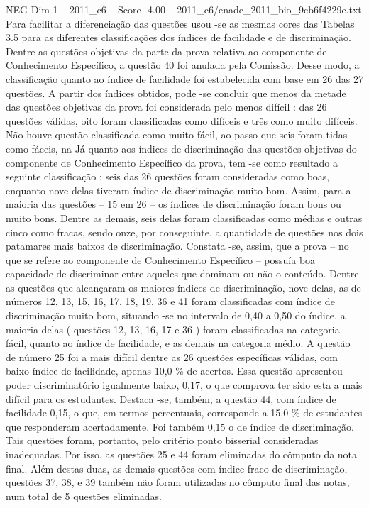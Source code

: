 \begin{textsample}{NEG Dim 1 – 2011\_c6 – Score -4.00 – 2011\_c6/enade\_2011\_bio\_9cb6f4229e.txt}
Para facilitar a diferenciação das questões usou -se as mesmas cores das Tabelas 3.5 para as diferentes classificações dos índices de facilidade e de discriminação.
Dentre as questões objetivas da parte da prova relativa ao componente de Conhecimento Específico, a questão 40 foi anulada pela Comissão.
Desse modo, a classificação quanto ao índice de facilidade foi estabelecida com base em 26 das 27 questões.
A partir dos índices obtidos, pode -se concluir que menos da metade das questões objetivas da prova foi considerada pelo menos difícil : das 26 questões válidas, oito foram classificadas como difíceis e três como muito difíceis.
Não houve questão classificada como muito fácil, ao passo que seis foram tidas como fáceis, na Já quanto aos índices de discriminação das questões objetivas do componente de Conhecimento Específico da prova, tem -se como resultado a seguinte classificação : seis das 26 questões foram consideradas como boas, enquanto nove delas tiveram índice de discriminação muito bom.
Assim, para a maioria das questões – 15 em 26 – os índices de discriminação foram bons ou muito bons.
Dentre as demais, seis delas foram classificadas como médias e outras cinco como fracas, sendo onze, por conseguinte, a quantidade de questões nos dois patamares mais baixos de discriminação.
Constata -se, assim, que a prova – no que se refere ao componente de Conhecimento Específico – possuía boa capacidade de discriminar entre aqueles que dominam ou não o conteúdo.
Dentre as questões que alcançaram os maiores índices de discriminação, nove delas, as de números 12, 13, 15, 16, 17, 18, 19, 36 e 41 foram classificadas com índice de discriminação muito bom, situando -se no intervalo de 0,40 a 0,50 do índice, a maioria delas ( questões 12, 13, 16, 17 e 36 ) foram classificadas na categoria fácil, quanto ao índice de facilidade, e as demais na categoria médio.
A questão de número 25 foi a mais difícil dentre as 26 questões específicas válidas, com baixo índice de facilidade, apenas 10,0 \% de acertos.
Essa questão apresentou poder discriminatório igualmente baixo, 0,17, o que comprova ter sido esta a mais difícil para os estudantes.
Destaca -se, também, a questão 44, com índice de facilidade 0,15, o que, em termos percentuais, corresponde a 15,0 \% de estudantes que responderam acertadamente.
Foi também 0,15 o de índice de discriminação.
Tais questões foram, portanto, pelo critério ponto bisserial consideradas inadequadas.
Por isso, as questões 25 e 44 foram eliminadas do cômputo da nota final.
Além destas duas, as demais questões com índice fraco de discriminação, questões 37, 38, e 39 também não foram utilizadas no cômputo final das notas, num total de 5 questões eliminadas.

\end{textsample}
